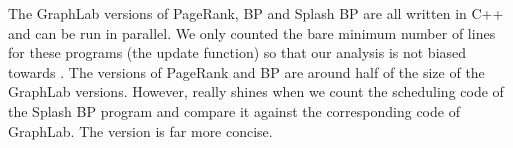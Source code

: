 The GraphLab versions of PageRank, BP and Splash BP are all written in C++ and can be run in
parallel. We only counted the bare minimum number of lines for these programs (the update function)
so that our analysis is not biased towards \lang. The \lang versions of PageRank and BP are around
half of the size of the GraphLab versions. However, \lang really shines when we count the scheduling
code of the Splash BP program and compare it against the corresponding code of GraphLab. The \lang
version is far more concise.
